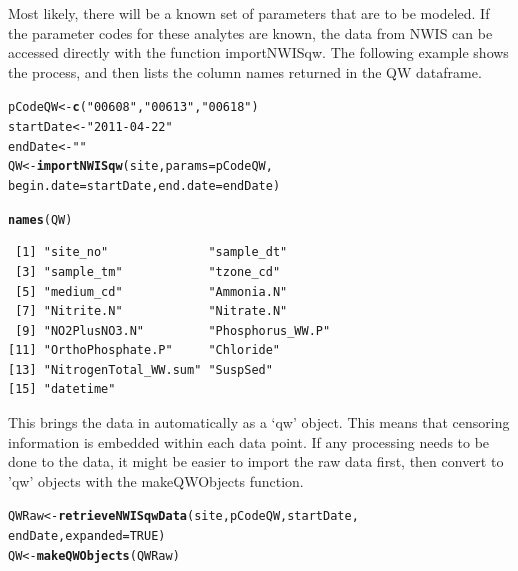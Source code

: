 \documentclass[a4paper,11pt]{article}\usepackage[]{graphicx}\usepackage[]{color}
\makeatletter
\newcommand{\hlstr}[1]{\textcolor[rgb]{0.192,0.494,0.8}{#1}}%
\newcommand{\hlkwd}[1]{\textcolor[rgb]{0.737,0.353,0.396}{\textbf{#1}}}%
\newenvironment{kframe}{%
 \def\at@end@of@kframe{}%
 \ifinner\ifhmode%
  \def\at@end@of@kframe{\end{minipage}}%
  \begin{minipage}{\columnwidth}%
 \fi\fi%
 \def\FrameCommand##1{\hskip\@totalleftmargin \hskip-\fboxsep
 \colorbox{shadecolor}{##1}\hskip-\fboxsep
     \hskip-\linewidth \hskip-\@totalleftmargin \hskip\columnwidth}%
 \MakeFramed {\advance\hsize-\width
   \@totalleftmargin\z@ \linewidth\hsize
   \@setminipage}}%
 {\par\unskip\endMakeFramed%
 \at@end@of@kframe}
\newenvironment{knitrout}{}{} %
\makeatother
\begin{document}
Most likely, there will be a known set of parameters that are to be modeled. If the parameter codes for these analytes are known, the data from NWIS can be accessed directly with the function importNWISqw. The following example shows the process, and then lists the column names returned in the QW dataframe.


\begin{knitrout}
\color{fgcolor}\begin{kframe}
\begin{alltt}
pCodeQW <- \hlkwd{c}(\hlstr{"00608"},\hlstr{"00613"},\hlstr{"00618"})
startDate <- \hlstr{"2011-04-22"}
endDate <- \hlstr{""}
QW <- \hlkwd{importNWISqw}(site, params=pCodeQW, 
                   begin.date=startDate, end.date=endDate)
\end{alltt}
\end{kframe}
\end{knitrout}





\begin{knitrout}
\color{fgcolor}\begin{kframe}
\begin{alltt}
\hlkwd{names}(QW)
\end{alltt}
\begin{verbatim}
 [1] "site_no"              "sample_dt"           
 [3] "sample_tm"            "tzone_cd"            
 [5] "medium_cd"            "Ammonia.N"           
 [7] "Nitrite.N"            "Nitrate.N"           
 [9] "NO2PlusNO3.N"         "Phosphorus_WW.P"     
[11] "OrthoPhosphate.P"     "Chloride"            
[13] "NitrogenTotal_WW.sum" "SuspSed"             
[15] "datetime"            
\end{verbatim}
\end{kframe}
\end{knitrout}



This brings the data in automatically as a `qw' object. This means that censoring information is embedded within each data point. If any processing needs to be done to the data, it might be easier to import the raw data first, then convert to 'qw' objects with the makeQWObjects function.

\begin{knitrout}
\color{fgcolor}\begin{kframe}
\begin{alltt}

QWRaw <- \hlkwd{retrieveNWISqwData}(site,pCodeQW,startDate,
                            endDate,expanded=TRUE)
QW <- \hlkwd{makeQWObjects}(QWRaw)
\end{alltt}
\end{kframe}
\end{knitrout}
\end{document}
